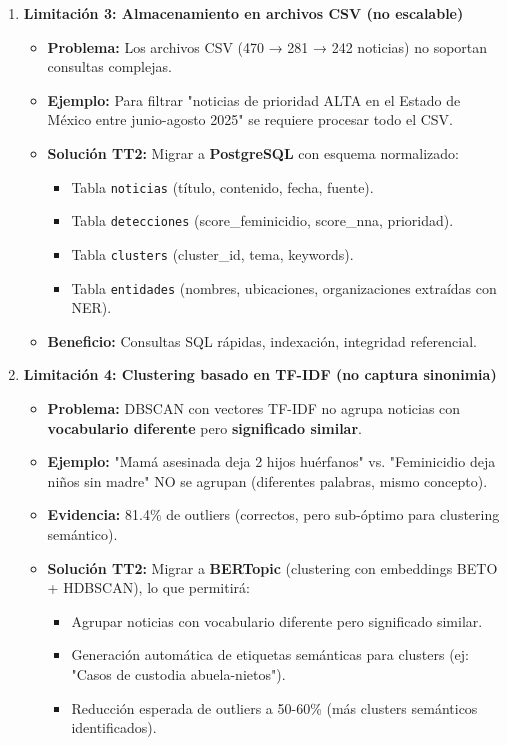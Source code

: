 \begin{enumerate}
    \item \textbf{Limitación 3: Almacenamiento en archivos CSV (no escalable)}
    \begin{itemize}
        \item \textbf{Problema:} Los archivos CSV (470 → 281 → 242 noticias) no soportan consultas complejas.
        \item \textbf{Ejemplo:} Para filtrar "noticias de prioridad ALTA en el Estado de México entre junio-agosto 2025" se requiere procesar todo el CSV.
        \item \textbf{Solución TT2:} Migrar a \textbf{PostgreSQL} con esquema normalizado:
        \begin{itemize}
            \item Tabla \texttt{noticias} (título, contenido, fecha, fuente).
            \item Tabla \texttt{detecciones} (score\_feminicidio, score\_nna, prioridad).
            \item Tabla \texttt{clusters} (cluster\_id, tema, keywords).
            \item Tabla \texttt{entidades} (nombres, ubicaciones, organizaciones extraídas con NER).
        \end{itemize}
        \item \textbf{Beneficio:} Consultas SQL rápidas, indexación, integridad referencial.
    \end{itemize}
    
    \item \textbf{Limitación 4: Clustering basado en TF-IDF (no captura sinonimia)}
    \begin{itemize}
        \item \textbf{Problema:} DBSCAN con vectores TF-IDF no agrupa noticias con \textbf{vocabulario diferente} pero \textbf{significado similar}.
        \item \textbf{Ejemplo:} "Mamá asesinada deja 2 hijos huérfanos" vs. "Feminicidio deja niños sin madre" NO se agrupan (diferentes palabras, mismo concepto).
        \item \textbf{Evidencia:} 81.4\% de outliers (correctos, pero sub-óptimo para clustering semántico).
        \item \textbf{Solución TT2:} Migrar a \textbf{BERTopic} (clustering con embeddings BETO + HDBSCAN), lo que permitirá:
        \begin{itemize}
            \item Agrupar noticias con vocabulario diferente pero significado similar.
            \item Generación automática de etiquetas semánticas para clusters (ej: "Casos de custodia abuela-nietos").
            \item Reducción esperada de outliers a 50-60\% (más clusters semánticos identificados).
        \end{itemize}
    \end{itemize}
    

\end{enumerate}

